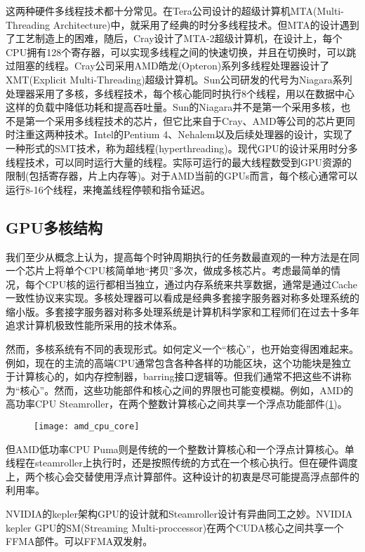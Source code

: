 这两种硬件多线程技术都十分常见。在Tera公司设计的超级计算机MTA(Multi-Threading Architecture)中，就采用了经典的时分多线程技术。但MTA的设计遇到了工艺制造上的困难，随后，Cray设计了MTA-2超级计算机，在设计上，每个CPU拥有128个寄存器，可以实现多线程之间的快速切换，并且在切换时，可以跳过阻塞的线程。Cray公司采用AMD皓龙(Opteron)系列多线程处理器设计了XMT(Explicit Multi-Threading)超级计算机。Sun公司研发的代号为Niagara系列处理器采用了多核，多线程技术，每个核心能同时执行8个线程，用以在数据中心这样的负载中降低功耗和提高吞吐量。Sun的Niagara并不是第一个采用多核，也不是第一个采用多线程技术的芯片，但它比来自于Cray、AMD等公司的芯片更同时注重这两种技术。Intel的Pentium 4、Nehalem以及后续处理器的设计，实现了一种形式的SMT技术，称为超线程(hyperthreading)。现代GPU的设计采用时分多线程技术，可以同时运行大量的线程。实际可运行的最大线程数受到GPU资源的限制(包括寄存器，片上内存等)。对于AMD当前的GPUs而言，每个核心通常可以运行8-16个线程，来掩盖线程停顿和指令延迟。

\subsection{GPU多核结构}
我们至少从概念上认为，提高每个时钟周期执行的任务数最直观的一种方法是在同一个芯片上将单个CPU核简单地“拷贝”多次，做成多核芯片。考虑最简单的情况，每个CPU核的运行都相当独立，通过内存系统来共享数据，通常是通过Cache一致性协议来实现。多核处理器可以看成是经典多套接字服务器对称多处理系统的缩小版。多套接字服务器对称多处理系统是计算机科学家和工程师们在过去十多年追求计算机极致性能所采用的技术体系。

然而，多核系统有不同的表现形式。如何定义一个“核心”，也开始变得困难起来。例如，现在的主流的高端CPU通常包含各种各样的功能区块，这个功能块是独立于计算核心的，如内存控制器，barring接口逻辑等。但我们通常不把这些不讲称为“核心”。然而，这些功能部件和核心之间的界限也可能变模糊。例如，AMD的高功率CPU Steamroller，在两个整数计算核心之间共享一个浮点功能部件(\ref{fig:amd_cpu_core})。
\begin{figure}[htbp]
	\centering
	\texttt{[image: amd\_cpu\_core]}
	\label{fig:amd_cpu_core}
\end{figure}

但AMD低功率CPU Puma则是传统的一个整数计算核心和一个浮点计算核心。单线程在steamroller上执行时，还是按照传统的方式在一个核心执行。但在硬件调度上，两个核心会交替使用浮点计算部件。这种设计的初衷是尽可能提高浮点部件的利用率。

NVIDIA的kepler架构GPU的设计就和Steamroller设计有异曲同工之妙。NVIDIA kepler GPU的SM(Streaming Multi-proccessor)在两个CUDA核心之间共享一个FFMA部件。可以FFMA双发射。

